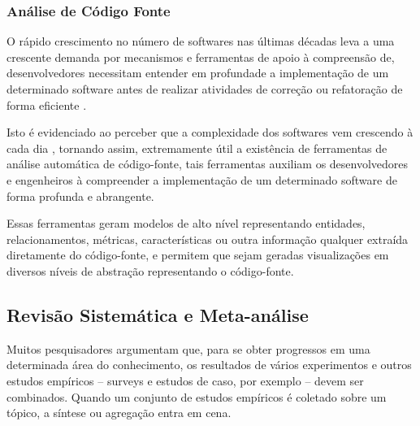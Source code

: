 \documentclass[12pt]{article}
\begin{document}
%

\subsubsection{Análise de Código Fonte}

O rápido crescimento no número de softwares nas últimas décadas leva a uma
crescente demanda por mecanismos e ferramentas de apoio à compreensão de,
desenvolvedores necessitam entender em profundade a implementação de um
determinado software antes de realizar atividades de correção ou refatoração
de forma eficiente \cite{Kirkov2010}.

Isto é evidenciado ao perceber que a complexidade dos softwares vem crescendo
à cada dia \cite{Kirkov2010}, tornando assim, extremamente útil a existência
de ferramentas de análise automática de código-fonte, tais ferramentas
auxiliam os desenvolvedores e engenheiros à compreender a implementação de um
determinado software de forma profunda e abrangente.

Essas ferramentas geram modelos de alto nível representando entidades,
relacionamentos, métricas, características ou outra informação qualquer
extraída diretamente do código-fonte, e permitem que sejam geradas
visualizações em diversos níveis de abstração representando o código-fonte.


\subsection{Revisão Sistemática e Meta-análise}

Muitos pesquisadores argumentam que, para se obter progressos em uma
determinada área do conhecimento, os resultados de vários experimentos e
outros estudos empíricos -- surveys e estudos de caso, por exemplo -- devem
ser combinados. Quando um conjunto de estudos empíricos é coletado sobre um
tópico, a síntese ou agregação entra em cena.
\end{document}

